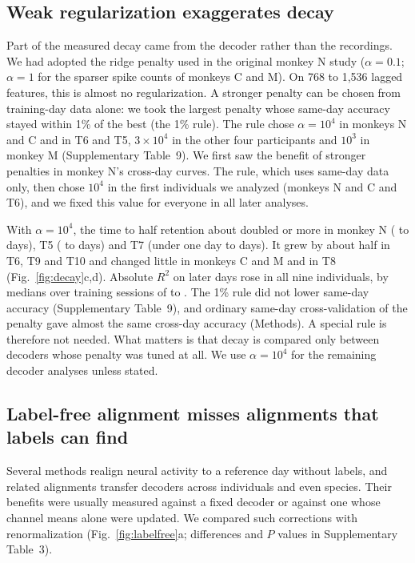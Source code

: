 \documentclass[pdflatex,sn-nature]{sn-jnl}
\begin{document}
\subsection*{Weak regularization exaggerates decay}

Part of the measured decay came from the decoder rather than the recordings. We had adopted the ridge penalty used in
the original monkey N study\cite{temmar2025} ($\alpha = 0.1$; $\alpha = 1$ for the sparser spike counts of monkeys C and
M). On 768 to 1,536 lagged features, this is almost no regularization. A stronger penalty can be chosen from training-day data
alone: we took the largest penalty whose same-day accuracy stayed within 1\% of the best (the 1\% rule). The rule chose
$\alpha = 10^4$ in monkeys N and C and in T6 and T5, $3 \times 10^4$ in the other four participants and $10^3$ in monkey
M (Supplementary Table~9). We first saw the benefit of stronger penalties in monkey N's cross-day curves. The rule, which
uses same-day data only, then chose $10^4$ in the first individuals we analyzed (monkeys N and C and T6), and we fixed
this value for everyone in all later analyses.

With $\alpha = 10^4$, the time to half retention about doubled or more in monkey N ( to
 days), T5 ( to  days) and T7 (under one day to 
days). It grew by about half in T6, T9 and T10 and changed little in monkeys C and M and in T8 (Fig.~\ref{fig:decay}c,d).
Absolute $R^2$ on later days rose in all nine individuals, by medians over training sessions of
 to . The 1\% rule did not lower same-day accuracy (Supplementary
Table~9), and ordinary same-day cross-validation of the penalty gave almost the same cross-day accuracy (Methods). A
special rule is therefore not needed. What matters is that decay is compared only between decoders whose penalty was
tuned at all. We use $\alpha = 10^4$ for the remaining decoder analyses unless stated.

\subsection*{Label-free alignment misses alignments that labels can find}

Several methods realign neural activity to a reference day without labels\cite{degenhart2020,gallego2020,
farshchian2019,ma2023,karpowicz2025,jude2022,wang2023erdiff}, and related alignments transfer decoders across
individuals and even species\cite{safaie2023,rizzoglio2023}. Their benefits were usually measured against a fixed decoder or against one whose
channel means alone were updated\cite{ma2023,wilson2025}. We compared such corrections with renormalization
(Fig.~\ref{fig:labelfree}a; differences and $P$ values in Supplementary Table~3).
\end{document}
